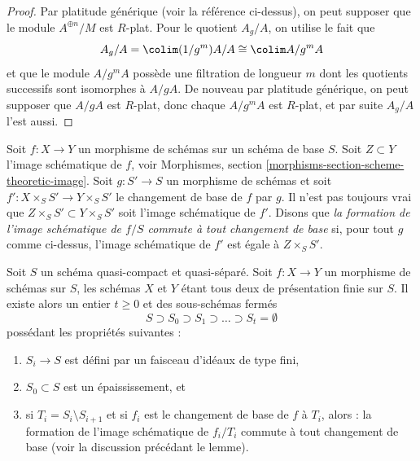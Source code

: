 \begin{proof}
\medskip\noindent
Par platitude générique (voir la référence ci-dessus), on peut supposer que le
module $A^{\oplus n}/M$ est $R$-plat. Pour le quotient $A_g/A$,
on utilise le fait que
$$
A_g/A = \colim (1/g^m)A/A \cong \colim A/g^mA
$$
et que le module $A/g^mA$ possède une filtration de longueur $m$ dont les
quotients successifs sont isomorphes à $A/gA$. De nouveau par platitude
générique, on peut supposer que $A/gA$ est $R$-plat, donc chaque $A/g^mA$
est $R$-plat, et par suite $A_g/A$ l'est aussi.
\end{proof}

\noindent
Soit $f : X \to Y$ un morphisme de schémas sur un schéma de base $S$.
Soit $Z \subset Y$ l'image schématique de $f$, voir
Morphismes, section \ref{morphisms-section-scheme-theoretic-image}.
Soit $g : S' \to S$ un morphisme de schémas et soit
$f' : X \times_S S' \to Y \times_S S'$ le changement de base de $f$ par $g$.
Il n'est pas toujours vrai que $Z \times_S S' \subset Y \times_S S'$
soit l'image schématique de $f'$.
Disons que {\it la formation de l'image schématique de $f/S$
commute à tout changement de base} si, pour tout $g$ comme ci-dessus,
l'image schématique de $f'$ est égale à $Z \times_S S'$.

\begin{lemma}
\label{lemma-base-change-scheme-theoretic-image}
Soit $S$ un schéma quasi-compact et quasi-séparé.
Soit $f : X \to Y$ un morphisme de schémas sur $S$, les schémas
$X$ et $Y$ étant tous deux de présentation finie sur $S$.
Il existe alors un entier $t \geq 0$ et des sous-schémas fermés
$$
S \supset S_0 \supset S_1 \supset \ldots \supset S_t = \emptyset
$$
possédant les propriétés suivantes :
\begin{enumerate}
\item $S_i \to S$ est défini par un faisceau d'idéaux de type fini,
\item $S_0 \subset S$ est un épaississement, et
\item si $T_i = S_i \setminus S_{i + 1}$ et si $f_i$ est le changement de
base de $f$ à $T_i$, alors :
la formation de l'image schématique de $f_i/T_i$
commute à tout changement de base (voir la discussion précédant le lemme).
\end{enumerate}
\end{lemma}

